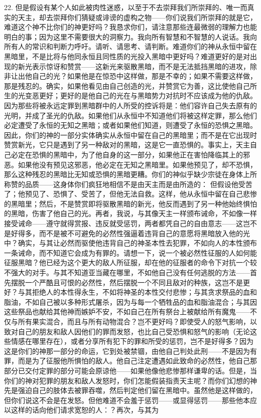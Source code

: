 22. 但是假设有某个人如此被肉性迷惑，以至于不去崇拜我们所崇拜的、唯一而真实的天主，却去崇拜你们猜疑或诽谤的虚构之物——你们说我们所崇拜的就是它，难道这个神不比你们的神更好吗？我恳求你们，请注意那些连最微弱的理解力也能明白的事；因为这里不需要很大的洞察力。我向所有智慧和不智慧的人说话。我向所有人的常识和判断力呼吁。请听、请思考、请判断。难道你们的神从永恒中留在黑暗里，不是比将与他同永恒且同性质的光投入黑暗中更好吗？难道更好的是对出现的新光表示惊讶和赞赏——这新光来驱散黑暗，而不是无法抵挡黑暗的进攻，除非让出他自己的光？如果他是在惊恐中这样做，那是不幸的；如果不需要这样做，那是残忍的。确实，如果他看见由自己创造的光，并赞赏它为善，这比使他自己所生的光变恶更好；更好的是他自己的光在与黑暗势力对抗时不应该成为他的仇敌。因为那些将被永远定罪到黑暗群中的人所受的控诉将是：他们容许自己失去原有的光明，并成了圣光的仇敌。如果他们从永恒中不知道他们将被这样定罪，那么他们必定遭受了永恒的无知之黑暗；或者如果他们知道，则遭受了永恒的恐惧之黑暗。因此，你们的神的一部分实体确实从永恒中留在自己的黑暗里；而不是在它出现时赞赏新光，它只是遇到了另一种敌对的黑暗，这是它一直恐惧的。事实上，天主自己必定在恐惧的黑暗中，为了他自身的这一部分，如果他正在害怕降临其上的邪恶。如果他没有预见这邪恶，他必定在无知之黑暗里。如果他预见了，却不恐惧，那么这种残忍的黑暗比无知或恐惧的黑暗更糟。你们的神似乎缺少宗徒在身体上所称赞的品质——这身体你们疯狂地相信不是由天主而是由所造的： 但假设他受苦了；他预见了、恐惧了、受苦了，但他无法自救。这样，他从永恒中留在自己悲惨的黑暗里；然后，不是赞赏即将驱散黑暗的新光，他反而遇到了另一种他始终惧怕的黑暗，伤害了他自己的光。再者，我说，与其像天主一样颁布诫命，不如像一样接受诫命——遵守就得赏报、违反就受惩罚，两者都凭自己的自由意志——这岂不是好得多，而不是被不可避免的必然性强逼着违背自己的意愿将黑暗放入他的光中？确实，与其让必然而驱使他违背自己的神圣本性去犯罪，不如向人的本性颁布一条诫命，而不知道它会成为有罪的。请想一下，说一个被必然性征服的人如何能征服黑暗？他已经为这个更大的敌人所征服，却在他的征服者的命令下对抗一个较不强大的对手。与其不知道亚当藏在哪里，不如他自己没有任何逃脱的方法——首先摆脱一个严酷且可恨的必然性，然后摆脱一个不同且敌对的种族，这岂不是更好？与其拒绝人的本性得永生，不如将神圣的本性交付悲惨；与其贪求祭品的血和脂油，不如自己被以多种形式屠杀，因为与每一个牺牲品的血和脂油混合；与其因这些祭品也献给其他神而嫉妒不安，不如自己在所有祭台上被献给所有魔鬼——不仅与所有果实混合，而且与所有动物混合？岂不更好吗？即使受人的怒气影响，以致对自己的朋友和敌人因他们的罪而发怒，也比自己受恐惧和怒气的影响（无论这些情感在哪里存在），或者分享所有犯下的罪和所受的惩罚，岂不是好得多？因为这是你们的神那一部分的命运，它到处被禁锢，由他自己判处此刑——不是因为有罪，而是为了征服他所惧怕的敌人。他自己注定遭遇如此致命的必然性，他自己那部分已交付定罪的部分可能会原谅他——如果他像他悲惨那样谦卑的话。但是，当你们的神对犯罪的朋友和敌人发怒时，你们怎能假装指责天主呢？而你们幻想的神先是强迫自己的肢体去被罪吞噬，然后判定他们留在黑暗中。虽然他是这样做的，但你们说这不会是在发怒。但他难道不会羞于惩罚——或显得惩罚——那些他本应以这样的话向他们请求宽恕的人：？再次，与其为